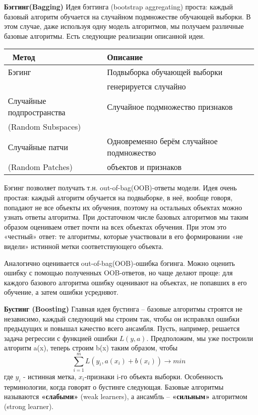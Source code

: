 \textbf{Бэггинг(Bagging)}
Идея бэггинга (bootstrap aggregating) проста: каждый базовый алгоритм обучается на случайном подмножестве обучающей выборки. В этом случае, даже используя одну модель алгоритмов, мы получаем различные базовые алгоритмы. Есть следующие реализации описанной идеи. \\
\begin{center}
\begin{tabular}{| m{3cm} | m{5cm}| } 
    \hline\
    Метод  & Описание \\
     \hline\hline
    Бэгинг  & Подвыборка обучающей выборки \\
     & генерируется случайно \\
     \hline
    Случайные подпространства & Случайное подмножество признаков \\
    (Random Subspaces) & \\
    \hline
    Случайные патчи & Одновременно берём случайное подмножество \\
    (Random Patches) & объектов и признаков\\
    \hline
 \end{tabular}
\end{center}

Бэгинг позволяет получать т.н. out-of-bag(OOB)-ответы модели. Идея очень простая: каждый алгоритм обучается на подвыборке, в неё, вообще говоря, попадают не все объекты их обучения, поэтому на остальных объектах можно узнать ответы алгоритма. При достаточном числе базовых алгоритмов мы таким образом оцениваем ответ почти на всех объектах обучения. При этом это «честный» ответ: те алгоритмы, которые участвовали в его формировании «не видели» истинной метки соответствующего объекта.

Аналогично оценивается out-of-bag(OOB)-ошибка бэгинга. Можно оценить ошибку с помощью полученных  OOB-ответов, но чаще делают проще: для каждого базового алгоритма ошибку оценивают на объектах, не попавших в его обучение, а затем ошибки усредняют.

\textbf{Бустинг (Boosting)}
Главная идея бустинга – базовые алгоритмы строятся не независимо, каждый следующий мы строим так, чтобы он исправлял ошибки предыдущих и повышал качество всего ансамбля. Пусть, например, решается задача регрессии с функцией ошибки $L(y, a)$. Предположим, мы уже построили алгоритм a(x), теперь строим b(x) таким образом, чтобы
\begin{equation}
    \displaystyle\sum_{i=1}^{m} L(y_i, a(x_i) + b(x_i)) \xrightarrow{} min
\end{equation}
где $y_i$ - истинная метка, $x_i$-признаки i-го объекта выборки.
Особенность терминологии, когда говорят о бустинге следующая. Базовые алгоритмы называются \textbf{«слабыми»} (weak learners),  а ансамбль – \textbf{«сильным»} алгоритмом (strong learner).

